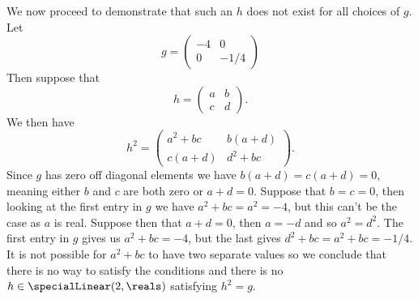 \documentclass[fleqn]{NotesClass}
\begin{document}
    We now proceed to demonstrate that such an \(h\) does not exist for all choices of \(g\).
    Let
    \begin{equation}
        g = 
        \begin{pmatrix}
            -4 & 0\\
            0 & -1/4
        \end{pmatrix}
    \end{equation}
    Then suppose that 
    \begin{equation}
        h = 
        \begin{pmatrix}
            a & b\\ c & d
        \end{pmatrix}
        .
    \end{equation}
    We then have
    \begin{equation}
        h^2 = 
        \begin{pmatrix}
            a^2 + bc & b(a + d)\\
            c(a + d) & d^2 + bc
        \end{pmatrix}
        .
    \end{equation}
    Since \(g\) has zero off diagonal elements we have \(b(a + d) = c(a + d) = 0\), meaning either \(b\) and \(c\) are both zero or \(a + d = 0\).
    Suppose that \(b = c = 0\), then looking at the first entry in \(g\) we have \(a^2 + bc = a^2 = -4\), but this can't be the case as \(a\) is real.
    Suppose then that \(a + d = 0\), then \(a = -d\) and so \(a^2 = d^2\).
    The first entry in \(g\) gives us \(a^2 + bc = -4\), but the last gives \(d^2 + bc = a^2 + bc = -1/4\).
    It is not possible for \(a^2 + bc\) to have two separate values so we conclude that there is no way to satisfy the conditions and there is no \(h \in \specialLinear(2, \reals)\) satisfying \(h^2 = g\).
    
\end{document}
